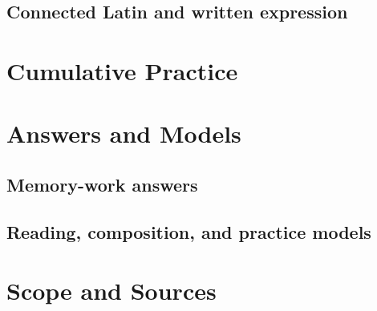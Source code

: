 \chapter{Connected Latin and written expression}
\solutionsfalse
\RenderModuleReaderSet{\ModuleReaderSet}
\ModulePractice

\clearpage
\part{Cumulative Practice}
\solutionsfalse
\SelectCourseUnits{\ModuleUnit}
\SelectWorksheetVariants{\ModuleWorksheetVariants}
\BeginExerciseBank{\ModuleExerciseBank}

\ModuleReadinessRecord

\clearpage
\part{Answers and Models}

\solutionstrue
\chapter{Memory-work answers}
\RenderModuleMemorySolutions{\ModuleMemorySet}
\chapter{Reading, composition, and practice models}
\RenderModuleReaderSet{\ModuleReaderSet}
\ModulePractice
\SelectCourseUnits{\ModuleUnit}
\SelectWorksheetVariants{\ModuleWorksheetVariants}
\BeginExerciseBank{\ModuleExerciseBank}

\solutionsfalse

\clearpage
\part{Scope and Sources}



{\footnotesize\ModuleGenerationMetadata}


